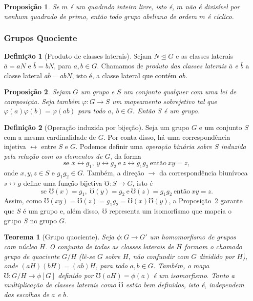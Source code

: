 \documentclass[a4paper,12pt]{report}
\theoremstyle{plain}
\newtheorem{teorema}{Teorema}[section]
\newtheorem{proposicao}{Proposição}[section]
\theoremstyle{definition}
\newtheorem{definicao}{Definição}[section]
\begin{document}
\begin{proposicao}
	Se $m$ é um \emph{quadrado inteiro livre}, isto é, $m$ não é divisível por nenhum quadrado de primo, então todo grupo abeliano de ordem $m$ é cíclico.
\end{proposicao}

\subsubsection{Grupos Quociente}

\begin{definicao}[Produto de classes laterais] Sejam $N\trianglelefteq G$ e as classes laterais \(\bar a = aN\) e \(\bar b = bN\), para $a,b \in G$. Chamamos de \emph{produto das classes laterais \(\bar a\) e \(\bar b\)} a classe lateral \(\bar a \bar b = abN\), isto é, a classe lateral que contém \(ab\).	
\end{definicao}


\begin{proposicao}\label{prop:grupoInduzidoPorOutro}
	Sejam \(G\) um grupo e \(S\) um conjunto qualquer
	com uma lei de composição. Seja também \(\varphi:G\longrightarrow S\) um
	mapeamento sobrejetivo tal que \(\varphi(a)\varphi(b) = \varphi(ab)\)
	para todo \(a\), \(b\in G\). Então \(S\) é um grupo.	
\end{proposicao}

\begin{definicao}[Operação induzida por bijeção]
	Seja um grupo $G$ e um conjunto $S$ com a mesma cardinalidade de $G$. Por conta disso, há uma correspondência injetiva $\leftrightarrow$ entre $S$ e $G$. Podemos definir uma \emph{operação binária sobre $S$ induzida pela relação com os elementos de $G$}, da forma
	$$\text{se }x\leftrightarrow g_1,\ y\leftrightarrow g_2\ \text{e}\ z\leftrightarrow g_1g_2\ \text{então} \ xy = z,$$ onde $x,y,z\in S$ e $g_1g_2\in G$. Também, a direção $\rightarrow$ da correspondência biunívoca $s\leftrightarrow g$ define uma função bijetiva $\mho: S \longrightarrow G$, isto é
	$$\text{se }\mho(x) = g_1,\ \mho(y) = g_2\ \text{e}\ \mho(z)= g_1g_2\ \text{então} \ xy = z.$$
	Assim, como $\mho(xy) =\mho(z) = g_1g_2 = \mho(x)\mho(y)$, a Proposição~\ref{prop:grupoInduzidoPorOutro} garante que $S$ é um grupo e, além disso, $\mho$ representa um isomorfismo que mapeia o grupo $S$ no grupo $G$.
\end{definicao}

\begin{teorema}[Grupo quociente]
	Seja $\phi: G \longrightarrow G'$ um homomorfismo de grupos com núcleo $H$. O conjunto de todas as classes laterais de $H$ formam o chamado \emph{grupo de quociente} $G/H$ (lê-se $G$ sobre $H$, não confundir com $G$ dividido por $H$), onde $(aH)(bH) = (ab)H$, para todo $a,b \in G$. Também, o mapa $\mho: G/H \longrightarrow \phi[G]$ definido por $\mho(aH) = \phi(a)$ é um isomorfismo. Tanto a multiplicação de classes laterais como $\mho$ estão bem definidos, isto é, independem das escolhas de $a$ e $b$.
\end{teorema}
\end{document}
